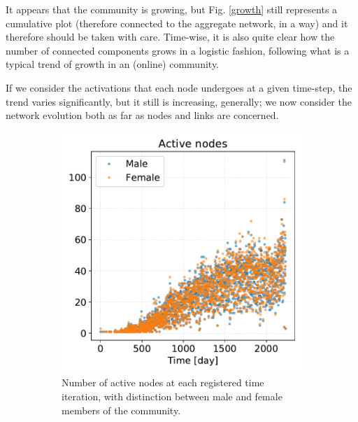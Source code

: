 \documentclass[a4paper,11pt, twocolumn]{article}
\begin{document}
It appears that the community is growing, but Fig. \ref{growth} still represents a cumulative plot (therefore connected to the aggregate network, in a way) and it therefore should be taken with care. Time-wise, it is also quite clear how the number of connected components grows in a logistic fashion, following what is a typical trend of growth in an (online) community.

If we consider the activations that each node undergoes at a given time-step, the trend varies significantly, but it still is increasing, generally; we now consider the network evolution both as far as nodes and links are concerned.

\begin{figure}[H]
\begin{subfigure}[t]{0.24\textwidth}
\centering
\includegraphics[width=\textwidth]{./Figure/Static/Active_nodes_MF.pdf}
\caption{Number of active nodes at each registered time iteration, with distinction between male and female members of the community.
}
\end{subfigure}
\begin{subfigure}[t]{0.24\textwidth}
 \centering

\end{subfigure}
\end{figure}
\end{document}
